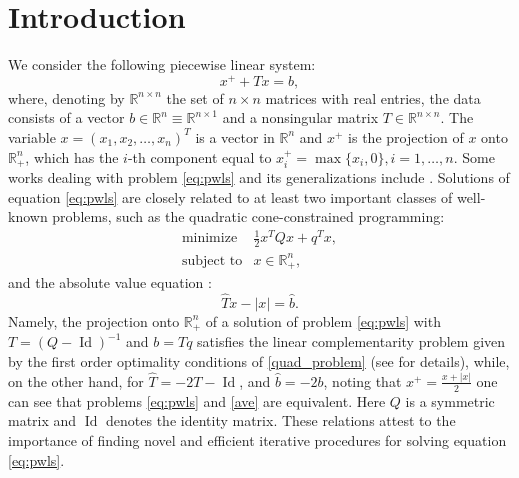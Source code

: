 \documentclass[11pt]{article}
\DeclareMathOperator{\Id}{Id}
\newcommand{\R}{\mathbb R}
\begin{document}
\section{Introduction}
We consider  the following  piecewise linear system:
\begin{equation}\label{eq:pwls}
		x^+ +Tx=b, 
\end{equation} 
where,  denoting by  $\R^{n \times n}$ the set of $n \times n$ matrices with real entries,  the data consists of  a   vector $b\in \R^n\equiv \R^{n \times 1}$ and  a  nonsingular  matrix $T\in\R^{n \times n}$. The  variable $x=(x_1, x_2 ,\ldots ,x_n)^T$ is  a vector in $\R^n$ and  $x^+$    is the projection of $x$ onto $\R^n_+$, which has the $i$-th component equal to $x_i^+=\max\{x_ i,0\}, i=1,\dots,n$.  
Some works dealing with problem \eqref{eq:pwls} and its generalizations include \cite{Chen:2010,Bello-Cruz:2017,Griewank:2015, Sun:2015,Mangasarian:2009a,Ferreira:2015,Barrios:2015}.  Solutions of equation \eqref{eq:pwls} are closely related to at least two important classes of well-known problems, such as the quadratic cone-constrained programming: 
\begin{equation}
\begin{matrix} \label{quad_problem}
\text{minimize} & \frac{1}{2}x^TQx+q^Tx, \\
\text{subject to} & x \in \R^n_+,
\end{matrix}
\end{equation} 
and the absolute value equation \cite{Mangasarian:2006,Mangasarian:2009a}:
\begin{equation}\label{ave}\hat Tx-|x|=\hat b.\end{equation}
Namely, the projection onto $\R^n_+$ of a solution of problem \eqref{eq:pwls} with $T = (Q-{\Id})^{-1}$ and $b =  Tq$ satisfies the linear complementarity problem given by the first order optimality conditions of \eqref{quad_problem} (see \cite{Barrios:2016} for details), while, on the other hand, for $\hat T= -2T-{\Id}$, and $\hat b=-2b$, noting that $x^+=\frac{x+|x|}{2}$ one can see that problems \eqref{eq:pwls} and \eqref{ave} are equivalent. Here $Q$ is a symmetric matrix and ${\Id}$ denotes the identity matrix. These relations attest to the importance of finding novel and efficient iterative procedures for solving equation \eqref{eq:pwls}.
\end{document}
